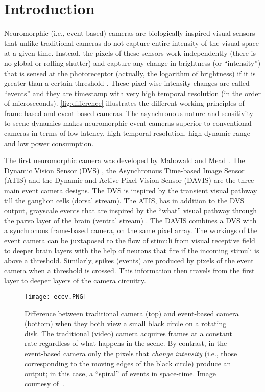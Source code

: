 \documentclass[10pt]{report}
\begin{document}
\section{Introduction}
\label{sec:introduction}
Neuromorphic (i.e., event-based) cameras are biologically inspired visual sensors that unlike traditional cameras do not capture entire intensity of the visual space at a given time. 
Instead, the pixels of these sensors work independently (there is no global or rolling shutter) and capture any change in brightness (or ``intensity'') that is sensed at the photoreceptor (actually, the logarithm of brightness) if it is greater than a certain threshold \cite{Boahen05sa}. 
These pixel-wise intensity changes are called ``events'' and they are timestamp with very high temporal resolution (in the order of microseconds).
\autoref{fig:difference} illustrates the different working principles of frame-based and event-based cameras.
The asynchronous nature and sensitivity to scene dynamics makes neuromorphic event cameras superior to conventional cameras in terms of low latency, high temporal resolution, high dynamic range and low power consumption.

The first neuromorphic camera was developed by Mahowald and Mead \cite{Mahowald91sciamer}. 
The Dynamic Vision Sensor (DVS) \cite{Lichtsteiner08ssc}, 
the Asynchronous Time-based Image Sensor (ATIS) \cite{Posch11ssc} 
and the Dynamic and Active Pixel Vision Sensor (DAVIS) \cite{Brandli14ssc} are the three main event camera designs. 
The DVS is inspired by the transient visual pathway till the ganglion cells (dorsal stream). 
The ATIS, has in addition to the DVS output, grayscale events that are inspired by the ``what'' visual pathway through the parvo layer of the brain (ventral stream) \cite{Posch14ieee}. 
The DAVIS combines a DVS with a synchronous frame-based camera, on the same pixel array.
The workings of the event camera can be juxtaposed to the flow of stimuli from visual receptive field to deeper brain layers with the help of neurons that fire if the incoming stimuli is above a threshold. 
Similarly, spikes (events) are produced by pixels of the event camera when a threshold is crossed. 
This information then travels from the first layer to deeper layers of the camera circuitry.

\begin{figure}
\centering
\texttt{[image: eccv.PNG]}
  \caption{Difference between traditional camera (top) and event-based camera (bottom) when they both view a small black circle on a rotating disk.
  The traditional (video) camera acquires frames at a constant rate regardless of what happens in the scene.
  By contrast, in the event-based camera only the pixels that \emph{change intensity} (i.e., those corresponding to the moving edges of the black circle) produce an output; in this case, a ``spiral'' of events in space-time.
  Image courtesy of~\cite{Kim16eccv}.}
  \label{fig:difference}
\end{figure}
\end{document}

